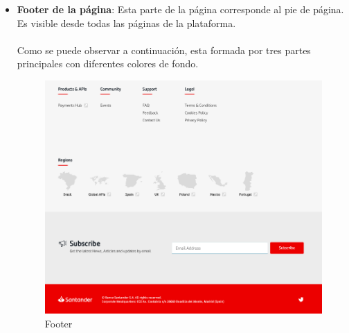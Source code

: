 \documentclass[a4paper,12pt]{article}
\begin{document}
\begin{itemize}
\begin{itemize}
        \item \textbf{Footer de la página}: Esta parte de la página corresponde al pie de página. Es visible desde todas las páginas de la plataforma.\\
        \\
        Como se puede observar a continuación, esta formada por tres partes principales con diferentes colores de fondo.
        \begin{figure}[H]
            \centering
            \includegraphics[scale=0.7]{footer.PNG}
            \caption{Footer}
            \label{fig:my_label}
        \end{figure}
        

\end{itemize}
\end{itemize}
\end{document}
